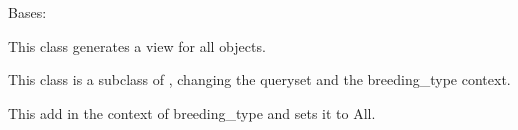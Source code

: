 \documentclass[letterpaper,10pt,english]{sphinxmanual}
\begin{document}

\begin{fulllineitems}
\label{api:mousedb.animal.views.BreedingListAll}
Bases: {\hyperref[api:mousedb.animal.views.BreedingList]{}}

This class generates a view for all {\hyperref[api:mousedb.animal.models.Breeding]{}} objects.

This class is a subclass of {\hyperref[api:mousedb.animal.views.BreedingList]{}}, changing the queryset and the  breeding\_type context.

\begin{fulllineitems}
\label{api:mousedb.animal.views.BreedingListAll.get_context_data}
This add in the context of breeding\_type and sets it to All.

\end{fulllineitems}



\end{fulllineitems}
\end{document}
